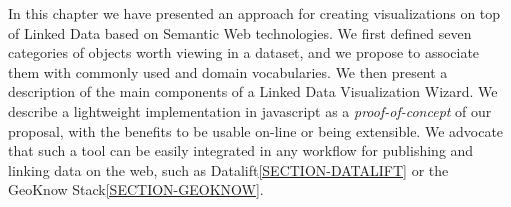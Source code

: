 In this chapter we have presented  an approach for creating visualizations on top of Linked Data based on Semantic Web technologies. We first defined seven categories of objects worth viewing in a dataset, and we propose to associate them with commonly used and domain vocabularies. We then present a description of the main components of a Linked Data Visualization Wizard. We describe a lightweight implementation in javascript as a \textit{proof-of-concept} of our proposal, with the benefits to be usable on-line or being extensible. We advocate that such a tool can be easily integrated  in any workflow for publishing and linking data on the web, such as Datalift\ref{SECTION-DATALIFT} or the GeoKnow Stack\ref{SECTION-GEOKNOW}. 
